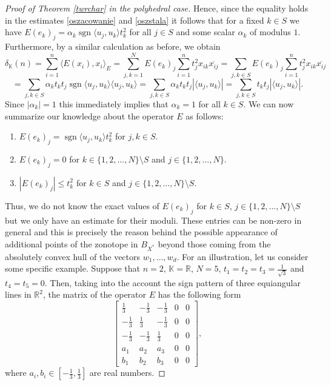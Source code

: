 \documentclass[12pt, reqno]{amsart}
\theoremstyle{definition}
\theoremstyle{remark}
\numberwithin{equation}{section}
\DeclareMathOperator{\sgn}{sgn}
\begin{document}
\begin{proof}[Proof of Theorem \ref{twrchar} in the polyhedral case]
Hence, since the equality holds in the estimates \eqref{oszacowanie} and \eqref{oszstala} it follows that for a fixed $k \in S$ we have $E(e_k)_j = \alpha_k \sgn \langle u_j, u_k \rangle t^2_k$ for all $j \in S$ and some scalar $\alpha_k$ of modulus $1$. Furthermore, by a similar calculation as before, we obtain
$$\delta_{\mathbb{K}}(n) = \sum_{i=1}^{n} \langle E(x_i), x_i \rangle_E = \sum_{j, k=1}^N E(e_k)_j \sum_{i=1}^{n} t_j^2  x_{ik}\overline{x_{ij}} = \sum_{j, k \in S} E(e_k)_j \sum_{i=1}^{n} t_j^2  x_{ik}\overline{x_{ij}}$$
$$= \sum_{j, k \in S} \alpha_k t_k t_j \sgn \langle u_j, u_k \rangle \langle u_j, u_k \rangle = \sum_{j, k \in S} \alpha_k t_k t_j |\langle u_j, u_k \rangle| = \sum_{j, k \in S} t_k t_j |\langle u_j, u_k \rangle|. $$
Since $|\alpha_k|=1$ this immediately implies that $\alpha_k=1$ for all $k \in S$. We can now summarize our knowledge about the operator $E$ as follows:
\begin{enumerate}
\item $E(e_k)_j = \sgn \langle u_j, u_k \rangle t^2_k$ for $j, k \in S$.
\item $E(e_k)_j = 0$ for $k \in \{1, 2, \ldots, N \} \setminus S$ and $j \in \{1, 2, \ldots, N\}$.
\item $|E(e_k)_j| \leq t_k^2$ for $k \in S$ and $j \in \{1, 2, \ldots, N\} \setminus S$.
\end{enumerate}
Thus, we do not know the exact values of $E(e_k)_j$ for $k \in S$, $j \in \{1, 2, \ldots, N\} \setminus S$ but we only have an estimate for their moduli. These entries can be non-zero in general and this is precisely the reason behind the possible appearance of additional points of the zonotope in $B_{X^*}$ beyond those coming from the absolutely convex hull of the vectors $w_1,\ldots,w_d$. For an illustration, let us consider some specific example. Suppose that $n=2$, $\mathbb{K}=\mathbb{R}$, $N=5$, $t_1=t_2=t_3 = \frac{1}{\sqrt{3}}$ and $t_4=t_5=0$. Then, taking into the account the sign pattern of three equiangular lines in $\mathbb{R}^2$, the matrix of the operator $E$ has the following form
$$\left [%
\begin{array}{ccccc}
  \frac{1}{3} & -\frac{1}{3} & -\frac{1}{3} & 0 & 0  \\
  -\frac{1}{3} & \frac{1}{3} & -\frac{1}{3} & 0 & 0 \\
  -\frac{1}{3} & -\frac{1}{3} & \frac{1}{3} & 0 & 0 \\
  a_1 & a_2 & a_3 & 0 & 0 \\
  b_1 & b_2 & b_3 & 0 & 0
\end{array}%
\right],
 $$
where $a_i, b_i \in \left [ -\frac{1}{3}, \frac{1}{3} \right ]$ are real numbers.


\end{proof}
\end{document}
